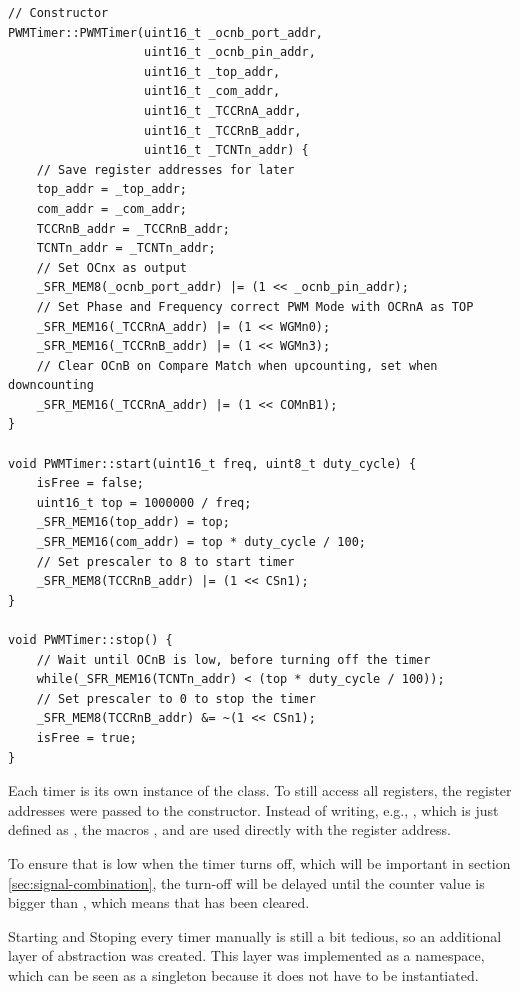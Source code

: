 \begin{lstlisting}[caption=PWMTimer class, label=lst:pwmtimer]
// Constructor
PWMTimer::PWMTimer(uint16_t _ocnb_port_addr,
				   uint16_t _ocnb_pin_addr,
				   uint16_t _top_addr,
				   uint16_t _com_addr,
				   uint16_t _TCCRnA_addr,
				   uint16_t _TCCRnB_addr, 
				   uint16_t _TCNTn_addr) {
    // Save register addresses for later
    top_addr = _top_addr;
    com_addr = _com_addr;
    TCCRnB_addr = _TCCRnB_addr;
    TCNTn_addr = _TCNTn_addr;
    // Set OCnx as output
    _SFR_MEM8(_ocnb_port_addr) |= (1 << _ocnb_pin_addr);
    // Set Phase and Frequency correct PWM Mode with OCRnA as TOP
    _SFR_MEM16(_TCCRnA_addr) |= (1 << WGMn0);
    _SFR_MEM16(_TCCRnB_addr) |= (1 << WGMn3);
    // Clear OCnB on Compare Match when upcounting, set when downcounting
    _SFR_MEM16(_TCCRnA_addr) |= (1 << COMnB1);
}

void PWMTimer::start(uint16_t freq, uint8_t duty_cycle) {
    isFree = false;
    uint16_t top = 1000000 / freq;
    _SFR_MEM16(top_addr) = top;
    _SFR_MEM16(com_addr) = top * duty_cycle / 100;
    // Set prescaler to 8 to start timer
    _SFR_MEM8(TCCRnB_addr) |= (1 << CSn1);
}

void PWMTimer::stop() {
    // Wait until OCnB is low, before turning off the timer
    while(_SFR_MEM16(TCNTn_addr) < (top * duty_cycle / 100));
    // Set prescaler to 0 to stop the timer
    _SFR_MEM8(TCCRnB_addr) &= ~(1 << CSn1);
    isFree = true;
}
\end{lstlisting}

Each timer is its own instance of the  class. To still access all registers, the register addresses were passed to the constructor. Instead of writing, e.g., , which is just defined as , the macros , and  are used directly with the register address.

To ensure that  is low when the timer turns off, which will be important in section \ref{sec:signal-combination}, the turn-off will be delayed until the counter value is bigger than , which means that  has been cleared.

Starting and Stoping every timer manually is still a bit tedious, so an additional layer of abstraction was created. This layer was implemented as a namespace, which can be seen as a singleton because it does not have to be instantiated.

